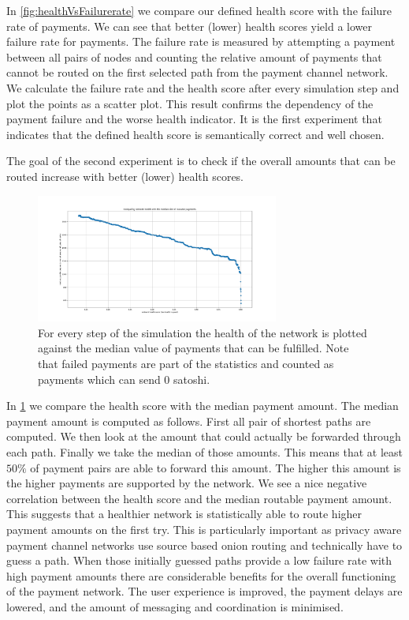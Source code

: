 \documentclass[a4paper]{paper}
\begin{document}
In \cref{fig:healthVsFailurerate} we compare our defined health score with the failure rate of payments.
We can see that better (lower) health scores yield a lower failure rate for payments.
The failure rate is measured by attempting a payment between all pairs of nodes and counting the relative amount of payments that cannot be routed on the first selected path from the payment channel network.
We calculate the failure rate and the health score after every simulation step and plot the points as a scatter plot.
This result confirms the dependency of the payment failure and the worse health indicator. It is the first experiment that indicates that the defined health score is semantically correct and well chosen. 

The goal of the second experiment is to check if the overall amounts that can be routed increase with better (lower) health scores.

\begin{figure}
 \centering
 \includegraphics[width=8cm]{code/results/routabilityTest/health vs payment amt.png}
 \caption{For every step of the simulation the health of the network is plotted against the median value of payments that can be fulfilled. Note that failed payments are part of the statistics and counted as payments which can send $0$ satoshi.}
 \label{fig:healthVsPayment}
\end{figure}

In \cref{fig:healthVsPayment} we compare the health score with the median payment amount.
The median payment amount is computed as follows.
First all pair of shortest paths are computed.
We then look at the amount that could actually be forwarded through each path.
Finally we take the median of those amounts.
This means that at least $50\%$ of payment pairs are able to forward this amount.
The higher this amount is the higher payments are supported by the network.
We see a nice negative correlation between the health score and the median routable payment amount.
This suggests that a healthier network is statistically able to route higher payment amounts on the first try.
This is particularly important as privacy aware payment channel networks use source based onion routing and technically have to guess a path. When those initially guessed paths provide a low failure rate with high payment amounts there are considerable benefits for the overall functioning of the payment network. 
The user experience is improved, the payment delays are lowered, and the amount of messaging and coordination is minimised. 
\end{document}
